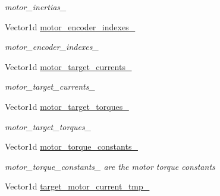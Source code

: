 \begin{DoxyCompactItemize}
\begin{DoxyCompactList}\small\item\em motor\+\_\+inertias\+\_\+ \end{DoxyCompactList}\item 
Vector1d \hyperlink{classblmc__robots_1_1SingleMotor_ab0ec410b7018e2f1c71d779c4b018622}{motor\+\_\+encoder\+\_\+indexes\+\_\+}\hypertarget{classblmc__robots_1_1SingleMotor_ab0ec410b7018e2f1c71d779c4b018622}{}\label{classblmc__robots_1_1SingleMotor_ab0ec410b7018e2f1c71d779c4b018622}

\begin{DoxyCompactList}\small\item\em motor\+\_\+encoder\+\_\+indexes\+\_\+ \end{DoxyCompactList}\item 
Vector1d \hyperlink{classblmc__robots_1_1SingleMotor_aa8abc257d4336ef830317f2371e3ce11}{motor\+\_\+target\+\_\+currents\+\_\+}\hypertarget{classblmc__robots_1_1SingleMotor_aa8abc257d4336ef830317f2371e3ce11}{}\label{classblmc__robots_1_1SingleMotor_aa8abc257d4336ef830317f2371e3ce11}

\begin{DoxyCompactList}\small\item\em motor\+\_\+target\+\_\+currents\+\_\+ \end{DoxyCompactList}\item 
Vector1d \hyperlink{classblmc__robots_1_1SingleMotor_a787f1cf4697845acb7ad32f61ba2a610}{motor\+\_\+target\+\_\+torques\+\_\+}\hypertarget{classblmc__robots_1_1SingleMotor_a787f1cf4697845acb7ad32f61ba2a610}{}\label{classblmc__robots_1_1SingleMotor_a787f1cf4697845acb7ad32f61ba2a610}

\begin{DoxyCompactList}\small\item\em motor\+\_\+target\+\_\+torques\+\_\+ \end{DoxyCompactList}\item 
Vector1d \hyperlink{classblmc__robots_1_1SingleMotor_af3c3dd00a54f188ef35a0a58f2aeea9a}{motor\+\_\+torque\+\_\+constants\+\_\+}\hypertarget{classblmc__robots_1_1SingleMotor_af3c3dd00a54f188ef35a0a58f2aeea9a}{}\label{classblmc__robots_1_1SingleMotor_af3c3dd00a54f188ef35a0a58f2aeea9a}

\begin{DoxyCompactList}\small\item\em motor\+\_\+torque\+\_\+constants\+\_\+ are the motor torque constants \end{DoxyCompactList}\item 
Vector1d \hyperlink{classblmc__robots_1_1SingleMotor_a3bee7675bed7fe92763dbe5c63e5d38b}{target\+\_\+motor\+\_\+current\+\_\+tmp\+\_\+}\hypertarget{classblmc__robots_1_1SingleMotor_a3bee7675bed7fe92763dbe5c63e5d38b}{}\label{classblmc__robots_1_1SingleMotor_a3bee7675bed7fe92763dbe5c63e5d38b}


\end{DoxyCompactItemize}
